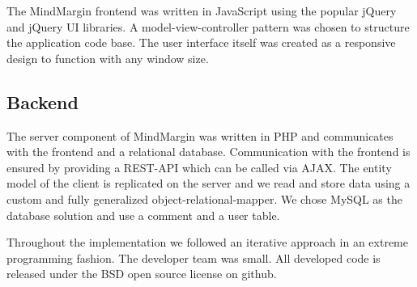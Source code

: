 The MindMargin frontend was written in JavaScript using the popular jQuery and jQuery UI libraries. A model-view-controller pattern was chosen to structure the application code base. The user interface itself was created as a responsive design to function with any window size.

\subsection{Backend}
The server component of MindMargin was written in PHP and communicates with the frontend and a relational database. Communication with the frontend is ensured by providing a REST-API which can be called via AJAX. The entity model of the client is replicated on the server and we read and store data using a custom and fully generalized object-relational-mapper. We chose MySQL as the database solution and use a comment and a user table.

Throughout the implementation we followed an iterative approach in an extreme programming fashion. The developer team was small. All developed code is released under the BSD open source license on github.